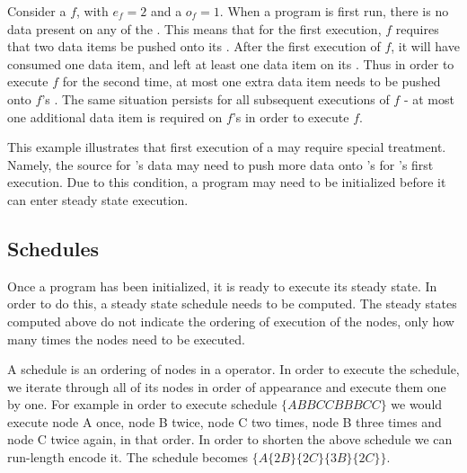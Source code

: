 Consider a {\filter} $f$, with $e_f = 2$ and a $o_f = 1$. When a
{\StreamIt} program is first run, there is no data present on any
of the {\Channels}.  This means that for the first execution,
{\filter} $f$ requires that two data items be pushed onto its
{\Input} {\Channel}.  After the first execution of $f$, it will
have consumed one data item, and left at least one data item on
its {\Input} {\Channel}.  Thus in order to execute $f$ for the
second time, at most one extra data item needs to be pushed onto
$f$'s {\Input} {\Channel}.  The same situation persists for all
subsequent executions of $f$ - at most one additional data item is
required on $f$'s {\Input} {\Channel} in order to execute $f$.

This example illustrates that first execution of a {\filter} may
require special treatment.  Namely, the source for {\filter}'s data
may need to push more data onto {\filter}'s {\Input} {\Channel} for
{\filter}'s first execution.  Due to this condition, a {\StreamIt}
program may need to be initialized before it can enter steady
state execution.

\begin{comment}
There are other constraints (latency constraints) which may
require more complex initialization.  These will be discussed in
Chapter \ref{chpt:constrained}.

After an execution, a {\filter} $f$ must leave at least $e_f - o_f$
data on its {\Input} {\Channel}.  Thus, if the only constraints on
initialization are peek-related, it is a sufficient condition for
entering steady state schedule that $\forall f \in {\filters}, in_f
\ge e_f - o_f$.

Specific strategies for generating initialization schedules for
peeking will be presented in Chapter \ref{chpt:hierarchical} and
Chapter \ref{chpt:phased}.
\end{comment}

\subsection{Schedules}
\label{sec:general:schedules}

Once a program has been initialized, it is ready to execute its
steady state. In order to do this, a steady state schedule needs
to be computed. The steady states computed above do not indicate
the ordering of execution of the nodes, only how many times the
nodes need to be executed.

A schedule is an ordering of nodes in a {\StreamIt} operator. In
order to execute the schedule, we iterate through all of its nodes
in order of appearance and execute them one by one.  For example
in order to execute schedule $\{ABBCCBBBCC\}$ we would execute
node A once, node B twice, node C two times, node B three times
and node C twice again, in that order. In order to shorten the
above schedule we can run-length encode it.  The schedule becomes
$\{A \{2B\}\{2C\}\{3B\}\{2C\}\}$.
